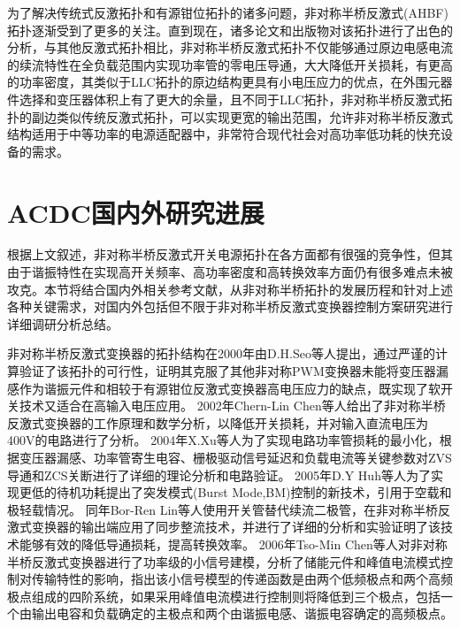 为了解决传统式反激拓扑和有源钳位拓扑的诸多问题，非对称半桥反激式(AHBF)拓扑逐渐受到了更多的关注。直到现在，诸多论文和出版物对该拓扑进行了出色的分析\cite{chen2002analysis,kim2012analysis,huber2017analysis}，与其他反激式拓扑相比，非对称半桥反激式拓扑不仅能够通过原边电感电流的续流特性在全负载范围内实现功率管的零电压导通，大大降低开关损耗，有更高的功率密度，其类似于LLC拓扑的原边结构更具有小电压应力的优点，在外围元器件选择和变压器体积上有了更大的余量，且不同于LLC拓扑，非对称半桥反激式拓扑的副边类似传统反激式拓扑，可以实现更宽的输出范围，允许非对称半桥反激式结构适用于中等功率的电源适配器中，非常符合现代社会对高功率低功耗的快充设备的需求。

\section{ACDC国内外研究进展}

根据上文叙述，非对称半桥反激式开关电源拓扑在各方面都有很强的竞争性，但其由于谐振特性在实现高开关频率、高功率密度和高转换效率方面仍有很多难点未被攻克。本节将结合国内外相关参考文献，从非对称半桥拓扑的发展历程和针对上述各种关键需求，对国内外包括但不限于非对称半桥反激式变换器控制方案研究进行详细调研分析总结。

非对称半桥反激式变换器的拓扑结构在2000年由D.H.Seo等人提出，通过严谨的计算验证了该拓扑的可行性，证明其克服了其他非对称PWM变换器未能将变压器漏感作为谐振元件和相较于有源钳位反激式变换器高电压应力的缺点，既实现了软开关技术又适合在高输入电压应用\cite{seo2000_AHB}。
2002年Chern-Lin Chen等人给出了非对称半桥反激式变换器的工作原理和数学分析，以降低开关损耗，并对输入直流电压为400V的电路进行了分析\cite{chen2002_AHB,chen2002_AHB1}。
2004年X.Xu等人为了实现电路功率管损耗的最小化，根据变压器漏感、功率管寄生电容、栅极驱动信号延迟和负载电流等关键参数对ZVS导通和ZCS关断进行了详细的理论分析和电路验证\cite{xu2004_AHB}。
2005年D.Y Huh等人为了实现更低的待机功耗提出了突发模式(Burst Mode,BM)控制的新技术，引用于空载和极轻载情况\cite{choi2005_BM1,lo2008_BM2}。
同年Bor-Ren Lin等人使用开关管替代续流二极管，在非对称半桥反激式变换器的输出端应用了同步整流技术，并进行了详细的分析和实验证明了该技术能够有效的降低导通损耗，提高转换效率\cite{lin2005_AHB}。
2006年Tso-Min Chen等人对非对称半桥反激式变换器进行了功率级的小信号建模，分析了储能元件和峰值电流模式控制对传输特性的影响，指出该小信号模型的传递函数是由两个低频极点和两个高频极点组成的四阶系统，如果采用峰值电流模进行控制则将降低到三个极点，包括一个由输出电容和负载确定的主极点和两个由谐振电感、谐振电容确定的高频极点\cite{chen2006_AHB}。




